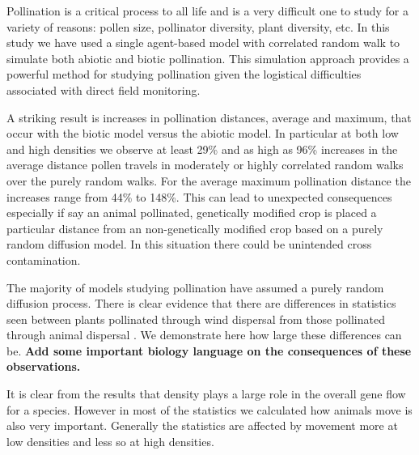 Pollination is a critical process to all life and is a very difficult one to study for a variety of reasons: pollen size, pollinator diversity, plant diversity, etc.  In this study we have used a single agent-based model with correlated random walk to simulate both abiotic and biotic pollination.
This simulation approach provides a powerful method for studying pollination given the logistical difficulties associated with direct field monitoring.
  
A striking result is increases in pollination distances, average and maximum, that occur with the biotic model versus the abiotic model.  In particular at both low and high densities we observe at least 29\% and as high as 96\% increases in the average distance pollen travels in moderately or highly correlated random walks over the purely random walks.  For the average maximum pollination distance the increases range from 44\% to 148\%.  This can lead to unexpected consequences especially if say an animal pollinated, genetically modified crop is placed a particular distance from an non-genetically modified crop based on a purely random diffusion model.  In this situation there could be unintended cross contamination.


The majority of models studying pollination have assumed a purely random diffusion process. There is
clear evidence that there are differences in statistics seen between plants pollinated through wind
dispersal from those pollinated through animal dispersal \cite{LevinKerster}.  We demonstrate here how large these differences can be.
{\bf Add some important biology language on the consequences of these observations.}

It is clear from the results that density plays a large role in the overall gene flow for a species.  However in most of the statistics we calculated how animals move is also very important.  Generally the statistics are affected by movement more at low densities and less so at high densities.

